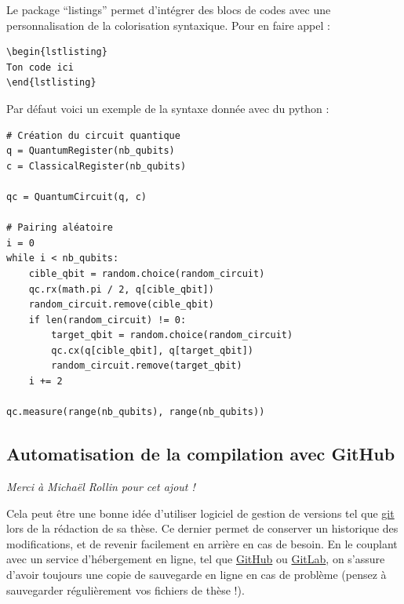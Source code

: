 \noindent Le package ``listings'' permet d'intégrer des blocs de codes avec une personnalisation de la colorisation syntaxique. Pour en faire appel :
{\small \begin{verbatim}
\begin{lstlisting}
Ton code ici
\end{lstlisting}
\end{verbatim}}
\noindent Par défaut voici un exemple de la syntaxe donnée avec du python :
\begin{lstlisting}
# Création du circuit quantique
q = QuantumRegister(nb_qubits)
c = ClassicalRegister(nb_qubits)

qc = QuantumCircuit(q, c)

# Pairing aléatoire
i = 0
while i < nb_qubits:
    cible_qbit = random.choice(random_circuit)
    qc.rx(math.pi / 2, q[cible_qbit])
    random_circuit.remove(cible_qbit)
    if len(random_circuit) != 0:
        target_qbit = random.choice(random_circuit)
        qc.cx(q[cible_qbit], q[target_qbit])
        random_circuit.remove(target_qbit)
    i += 2

qc.measure(range(nb_qubits), range(nb_qubits))
\end{lstlisting}

\subsection{Automatisation de la compilation avec GitHub}
\label{chap1:sec:exemple_compilation}

\noindent\textit{Merci à Michaël Rollin pour cet ajout !}\bigskip

Cela peut être une bonne idée d'utiliser logiciel de gestion de versions tel que \href{https://git-scm.com/}{git} lors de la rédaction de sa thèse. Ce dernier permet de conserver un historique des modifications, et de revenir facilement en arrière en cas de besoin. En le couplant avec un service d'hébergement en ligne, tel que \href{https://github.com/}{GitHub} ou \href{https://gitlab.com/gitlab-org/gitlab}{GitLab}, on s'assure d'avoir toujours une copie de sauvegarde en ligne en cas de problème (pensez à sauvegarder régulièrement vos fichiers de thèse !).\bigskip 

